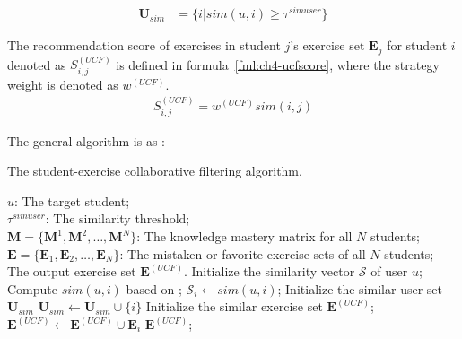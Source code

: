\begin{align}
    \mathbf{U}_{sim} & =\{i|sim(u,i)\geq\tau^{simuser}\}  \label{fml:ch4-simuserset}
\end{align}

The recommendation score of exercises in student \(j\)'s exercise set \(\mathbf{E}_j\) for student \(i\) denoted as \(S^{(UCF)}_{i,j}\) is defined in formula~\ref{fml:ch4-ucfscore}, where the strategy weight is denoted as \(w^{(UCF)}\).
\begin{align}\label{fml:ch4-ucfscore}
    S^{(UCF)}_{i,j} = w^{(UCF)} sim(i,j)
\end{align}

The general algorithm is as \algoname{\ref{alg:ch4-CF}}:
\begin{algorithm}[htbp!]
    \caption{The student-exercise collaborative filtering algorithm.}\label{alg:ch4-CF}
    \begin{algorithmic}[1]
        \REQUIRE{}
        \(u\): The target student;\\
        \(\tau^{simuser}\): The similarity threshold;\\
        \(\mathbf{M}=\{\mathbf{M}^1,\mathbf{M}^2,\ldots,\mathbf{M}^N\} \): The knowledge mastery matrix for all \(N\) students;\\
        \( \mathbf{E}=\{\mathbf{E}_1,\mathbf{E}_2,\ldots,\mathbf{E}_N\} \): The mistaken or favorite exercise sets of all \(N\) students;\\
        \ENSURE{}The output exercise set \(\mathbf{E}^{(UCF)} \).
        \STATE{}
        \STATE{}Initialize the similarity vector \(\mathcal{S}\) of user \(u\);
        \STATE{}Compute \(sim(u,i)\) based on \eqname{\ref{fml:ch4-user_similarity}};
        \STATE{}\(\mathcal{S}_i \leftarrow sim(u,i)\);
        \ENDFOR{}
        \STATE{}
        \STATE{}Initialize the similar user set \(\mathbf{U}_{sim}\)
        \STATE{}\(\mathbf{U}_{sim} \leftarrow \mathbf{U}_{sim}\cup \{i\} \)
        \ENDIF{}
        \ENDFOR{}
        \STATE{}
        \STATE{}Initialize the similar exercise set \(\mathbf{E}^{(UCF)}\);
        \STATE{}\(\mathbf{E}^{(UCF)} \leftarrow \mathbf{E}^{(UCF)} \cup \mathbf{E}_i\)
        \ENDFOR{}
        \RETURN{}\(\mathbf{E}^{(UCF)} \);%
    \end{algorithmic}
\end{algorithm}


